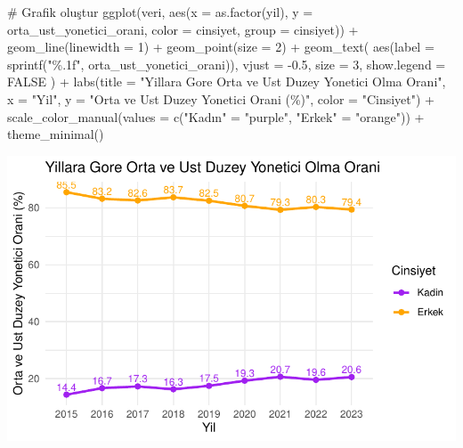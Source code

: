\documentclass[
  11pt,
  a4paper,
  DIV=11,
  numbers=noendperiod]{scrartcl}
\newenvironment{Shaded}{\begin{snugshade}}{\end{snugshade}}
\newcommand{\AttributeTok}[1]{\textcolor[rgb]{0.40,0.45,0.13}{#1}}
\newcommand{\CommentTok}[1]{\textcolor[rgb]{0.37,0.37,0.37}{#1}}
\newcommand{\ConstantTok}[1]{\textcolor[rgb]{0.56,0.35,0.01}{#1}}
\newcommand{\DecValTok}[1]{\textcolor[rgb]{0.68,0.00,0.00}{#1}}
\newcommand{\FloatTok}[1]{\textcolor[rgb]{0.68,0.00,0.00}{#1}}
\newcommand{\FunctionTok}[1]{\textcolor[rgb]{0.28,0.35,0.67}{#1}}
\newcommand{\NormalTok}[1]{\textcolor[rgb]{0.00,0.23,0.31}{#1}}
\newcommand{\OtherTok}[1]{\textcolor[rgb]{0.00,0.23,0.31}{#1}}
\newcommand{\SpecialCharTok}[1]{\textcolor[rgb]{0.37,0.37,0.37}{#1}}
\newcommand{\StringTok}[1]{\textcolor[rgb]{0.13,0.47,0.30}{#1}}
\begin{document}
\begin{Shaded}
\begin{Highlighting}[]
\CommentTok{\# Grafik oluştur}
\FunctionTok{ggplot}\NormalTok{(veri, }\FunctionTok{aes}\NormalTok{(}\AttributeTok{x =} \FunctionTok{as.factor}\NormalTok{(yil), }\AttributeTok{y =}\NormalTok{ orta\_ust\_yonetici\_orani, }\AttributeTok{color =}\NormalTok{ cinsiyet, }\AttributeTok{group =}\NormalTok{ cinsiyet)) }\SpecialCharTok{+}
  \FunctionTok{geom\_line}\NormalTok{(}\AttributeTok{linewidth =} \DecValTok{1}\NormalTok{) }\SpecialCharTok{+}
  \FunctionTok{geom\_point}\NormalTok{(}\AttributeTok{size =} \DecValTok{2}\NormalTok{) }\SpecialCharTok{+}
  \FunctionTok{geom\_text}\NormalTok{(}
    \FunctionTok{aes}\NormalTok{(}\AttributeTok{label =} \FunctionTok{sprintf}\NormalTok{(}\StringTok{"\%.1f"}\NormalTok{, orta\_ust\_yonetici\_orani)),}
    \AttributeTok{vjust =} \SpecialCharTok{{-}}\FloatTok{0.5}\NormalTok{,}
    \AttributeTok{size =} \DecValTok{3}\NormalTok{,}
    \AttributeTok{show.legend =} \ConstantTok{FALSE}
\NormalTok{  ) }\SpecialCharTok{+}
  \FunctionTok{labs}\NormalTok{(}\AttributeTok{title =} \StringTok{"Yillara Gore Orta ve Ust Duzey Yonetici Olma Orani"}\NormalTok{,}
       \AttributeTok{x =} \StringTok{"Yil"}\NormalTok{,}
       \AttributeTok{y =} \StringTok{"Orta ve Ust Duzey Yonetici Orani (\%)"}\NormalTok{,}
       \AttributeTok{color =} \StringTok{"Cinsiyet"}\NormalTok{) }\SpecialCharTok{+}
  \FunctionTok{scale\_color\_manual}\NormalTok{(}\AttributeTok{values =} \FunctionTok{c}\NormalTok{(}\StringTok{"Kadın"} \OtherTok{=} \StringTok{"purple"}\NormalTok{, }\StringTok{"Erkek"} \OtherTok{=} \StringTok{"orange"}\NormalTok{)) }\SpecialCharTok{+}
  \FunctionTok{theme\_minimal}\NormalTok{()}
\end{Highlighting}
\end{Shaded}

\includegraphics{project_files/figure-pdf/unnamed-chunk-5-1.pdf}
\end{document}
